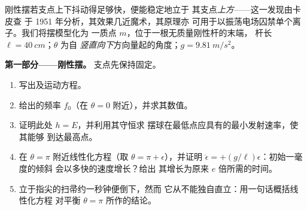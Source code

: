 \begin{problem}\label{pb:b3:lagrangian-mechanics:1}
刚性摆若支点上下抖动得足够快，便能稳定地立于
其支点\emph{上方}——这一发现由卡皮查
于 1951 年分析，其效果几近魔术，其原理亦
可用于以振荡电场囚禁单个离子。我们将摆模型化为
一质点 $m$，位于一根无质量刚性杆的末端，
杆长 $\ell = \qty{40}{cm}$；$\theta$ 为自
\emph{竖直向下}方向量起的角度；$g = \qty{9.81}{m/s^2}$。

\medskip\noindent\textbf{第一部分——刚性摆。}
支点先保持固定。
\begin{enumerate}
  \item 写出及运动方程。
  \item 给出的频率 $f_0$（在 $\theta =
        0$ 附近），并求其数值。
  \item 证明此处 $h = E$，并利用其守恒求
        摆球在最低点应具有的最小发射速率，使其能够
        到达最高点。
  \item 在 $\theta = \pi$ 附近线性化方程（取 $\theta = \pi +
        \epsilon$），并证明 $\ddot\epsilon = +(g/\ell)\epsilon$：初始一毫度的倾斜
        会以多快的速度增长？给出
        其增长为原来 $e$ 倍所需的时间。
  \item 立于指尖的扫帚约一秒钟便倒下，然而
        它从不能独自直立：用一句话概括线性化方程
        对平衡 $\theta = \pi$ 所作的结论。
\end{enumerate}


\end{problem}
